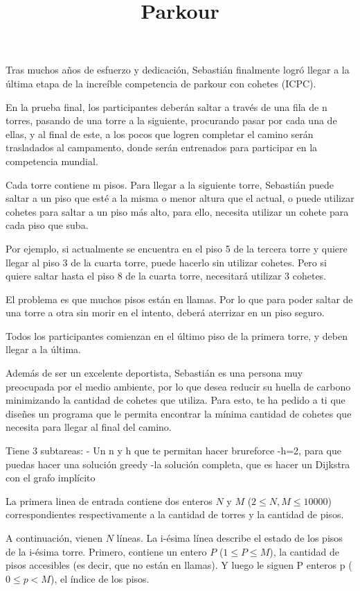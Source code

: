 \documentclass{oci}
\title{Parkour}
\begin{document}
\begin{problemDescription}
  Tras muchos años de esfuerzo y dedicación, Sebastián finalmente logró llegar a la última etapa de la increíble competencia de parkour con cohetes (ICPC).

  En la prueba final, los participantes deberán saltar a través de una fila de n torres, pasando de una torre a la siguiente, procurando pasar por cada una de ellas, y al final de este, a los pocos que logren completar el camino serán trasladados al campamento, donde serán entrenados para participar en la competencia mundial.

  Cada torre contiene m pisos. Para llegar a la siguiente torre, Sebastián puede saltar a un piso que esté a la misma o menor altura que el actual, o puede utilizar cohetes para saltar a un piso más alto, para ello, necesita utilizar un cohete para cada piso que suba.

  Por ejemplo, si actualmente se encuentra en el piso 5 de la tercera torre y quiere llegar al piso 3 de la cuarta torre, puede hacerlo sin utilizar cohetes. Pero si quiere saltar hasta el piso 8 de la cuarta torre, necesitará utilizar 3 cohetes.

  El problema es que muchos pisos están en llamas. Por lo que para poder saltar de una torre a otra sin morir en el intento, deberá aterrizar en un piso seguro.

  Todos los participantes comienzan en el último piso de la primera torre, y deben llegar a la última.

  Además de ser un excelente deportista, Sebastián es una persona muy preocupada por el medio ambiente, por lo que desea reducir su huella de carbono minimizando la cantidad de cohetes que utiliza. Para esto, te ha pedido a ti que diseñes un programa que le permita encontrar la mínima cantidad de cohetes que necesita para llegar al final del camino.

Tiene 3 subtareas:
- Un n y h que te permitan hacer brureforce
-h=2, para que puedas hacer una solución greedy
-la solución completa, que es hacer un Dijkstra con el grafo implícito
\end{problemDescription}

\begin{inputDescription}
  La primera linea de entrada contiene dos enteros $N$ y $M$ ($2 \leq N, M \leq 10000$) correspondientes respectivamente a la cantidad de torres y la cantidad de pisos.

  A continuación, vienen $N$ líneas. La i-ésima línea describe el estado de los pisos de la i-ésima torre. Primero, contiene un entero $P$ ($1 \leq P \leq M$), la cantidad de pisos accesibles (es decir, que no están en llamas). Y luego le siguen P enteros p ($0 \leq p < M$), el índice de los pisos.
\end{inputDescription}
\end{document}
